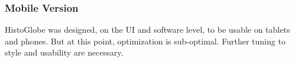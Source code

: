 \subsubsection{Mobile Version} %
\label{sub:mobile_version}
HistoGlobe was designed, on the UI and software level, to be usable on tablets and phones. But at this point, optimization is sub-optimal.
Further tuning to style and usability are necessary.


